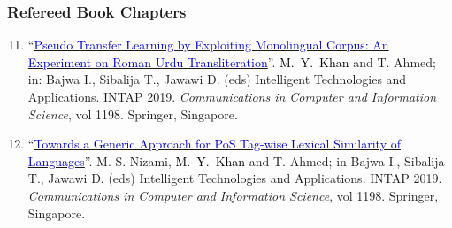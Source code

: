 \documentclass[a4paper, 10pt]{article}
\begin{document}
\subsubsection*{{Refereed Book Chapters}}
\begin{enumerate}
\setcounter{enumi}{10}
\itemsep-4pt
\item ``\href{https://doi.org/10.1007/978-981-15-5232-8_36}{\textcolor{MediumBlue}{Pseudo Transfer Learning by Exploiting Monolingual Corpus: An Experiment on Roman Urdu Transliteration}}''. \textcolor{Black}{M.~Y.~Khan} and T. Ahmed; in: Bajwa I., Sibalija T., Jawawi D. (eds) Intelligent Technologies and Applications. INTAP 2019. \emph{Communications in Computer and Information Science}, vol 1198. Springer, Singapore.

\item ``\href{https://doi.org/10.1007/978-981-15-5232-8_42}{\textcolor{MediumBlue}{Towards a Generic Approach for PoS Tag-wise Lexical Similarity of Languages}}''. M. S. Nizami, \textcolor{Black}{M.~Y.~Khan} and T. Ahmed; in Bajwa I., Sibalija T., Jawawi D. (eds) Intelligent Technologies and Applications. INTAP 2019. \emph{Communications in Computer and Information Science}, vol 1198. Springer, Singapore.

\end{enumerate}
\end{document}
